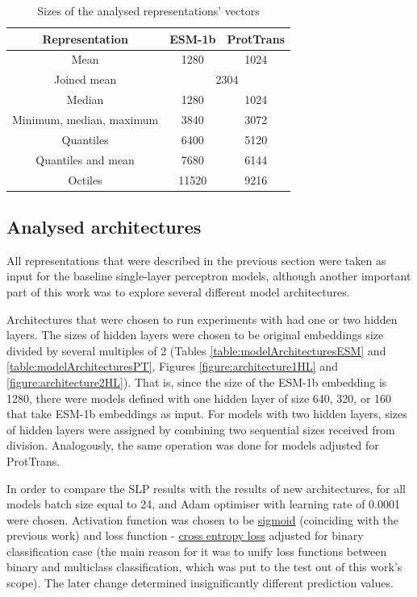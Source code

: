 \documentclass[12pt]{article}
\begin{document}
	\begin{table}[h!]
		\caption{Sizes of the analysed representations' vectors}
		\vspace{0.2cm}
		\centering
		\begin{tabular}{ | c | c c | }
			\hline 
			Representation & ESM-1b & ProtTrans \\
			\hline 
			Mean & 1280 & 1024 \\
			Joined mean & \multicolumn{2}{c|}{2304} \\
			Median & 1280 & 1024 \\
			Minimum, median, maximum & 3840 & 3072 \\
			Quantiles & 6400 & 5120 \\
			Quantiles and mean & 7680 & 6144 \\
			Octiles & 11520 & 9216 \\
			\hline    
		\end{tabular}
		\label{table:vectorsDimensions}
	\end{table}

	\newpage

	\subsection{Analysed architectures}

	All representations that were described
	in the previous section were taken as input for the baseline
	single-layer perceptron models, although another important part 
	of this work was to explore several different 
	model architectures. 

	Architectures that were chosen to run experiments with 
	had one or two hidden layers. The sizes of hidden layers 
	were chosen to be original embeddings size divided 
	by several multiples of 2 (Tables \ref{table:modelArchitecturesESM} 
	and \ref{table:modelArchitecturesPT}, 
	Figures \ref{figure:architecture1HL} and \ref{figure:architecture2HL}). That is, since the 
	size of the ESM-1b embedding is 1280, there were 
	models defined with one hidden layer of size 640, 320, or 160 
	that take ESM-1b embeddings as input. For models with two 
	hidden layers, sizes of hidden layers were assigned by 
	combining two sequential sizes received from division. 
	Analogously, the same operation was done for models adjusted 
	for ProtTrans.

	In order to compare the SLP results with the results of new 
	architectures, for all models 
	batch size equal to 24, and Adam optimiser \cite{kingma2014adam} 
	with learning rate of 0.0001 were chosen. Activation function was 
	chosen to be \href{https://pytorch.org/docs/stable/generated/torch.nn.Sigmoid.html}{sigmoid}
	(coinciding with the previous work) and loss function - 
	\href{https://pytorch.org/docs/stable/generated/torch.nn.CrossEntropyLoss.html}{cross entropy loss}
	adjusted for binary classification case (the main reason for it was to unify loss functions between 
	binary and multiclass classification, which was put to the test out of this work's scope). 
	The later change determined  insignificantly different prediction values.
\end{document}
